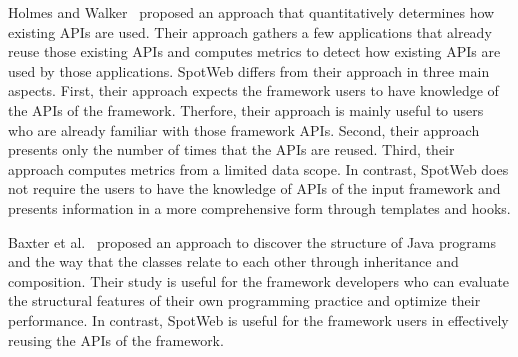 Holmes and Walker~\cite{holmes:apiusage} proposed an approach 
that quantitatively determines how existing APIs are used. Their approach
gathers a few applications that already reuse those existing APIs
and computes metrics to detect how existing APIs are used by those applications.
SpotWeb differs from their approach in three main aspects. First, their approach 
expects the framework users to have knowledge 
of the APIs of the framework. Therfore, their approach is mainly useful to users who are already
familiar with those framework APIs. Second, their approach presents only the
number of times that the APIs are reused. Third, their approach computes metrics
from a limited data scope. In contrast, SpotWeb does not require the users
to have the knowledge of APIs of the input framework and presents information
in a more comprehensive form through templates and hooks.

Baxter et al.~\cite{baxter:shape} proposed an approach to discover
the structure of Java programs and the way that the classes relate
to each other through inheritance and composition. Their study is
useful for the framework developers who can evaluate the structural
features of their own programming practice and optimize their
performance. In contrast, SpotWeb is useful for the framework users
in effectively reusing the APIs of the framework.